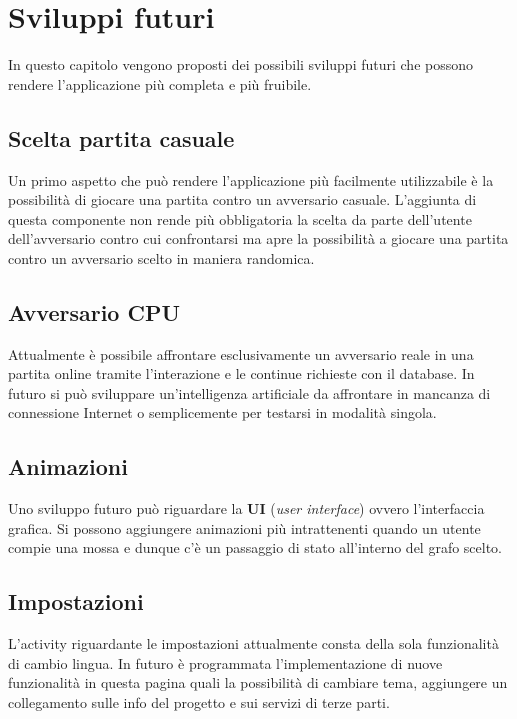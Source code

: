 \documentclass[a4paper,11pt,twoside,openright]{report}
\begin{document}
\chapter{Sviluppi futuri}
In questo capitolo vengono proposti dei possibili sviluppi futuri che possono rendere l'applicazione più completa e più fruibile.

\section{Scelta partita casuale}
Un primo aspetto che può rendere l'applicazione più facilmente utilizzabile è la possibilità di giocare una partita contro un avversario casuale. L'aggiunta di questa componente non rende più obbligatoria la scelta da parte dell'utente dell'avversario contro cui confrontarsi ma apre la possibilità a giocare una partita contro un avversario scelto in maniera randomica.

\section{Avversario CPU}
Attualmente è possibile affrontare esclusivamente un avversario reale in una partita online tramite l'interazione e le continue richieste con il database. In futuro si può sviluppare un'intelligenza artificiale da affrontare in mancanza di connessione Internet o semplicemente per testarsi in modalità singola.

\section{Animazioni}
Uno sviluppo futuro può riguardare la \textbf{UI} (\textit{user interface}) ovvero l'interfaccia grafica. Si possono aggiungere animazioni più intrattenenti quando un utente compie una mossa e dunque c'è un passaggio di stato all'interno del grafo scelto.

\section{Impostazioni}
L'activity riguardante le impostazioni attualmente consta della sola funzionalità di cambio lingua. In futuro è programmata l'implementazione di nuove funzionalità in questa pagina quali la possibilità di cambiare tema, aggiungere un collegamento sulle info del progetto e sui servizi di terze parti.



\end{document}
